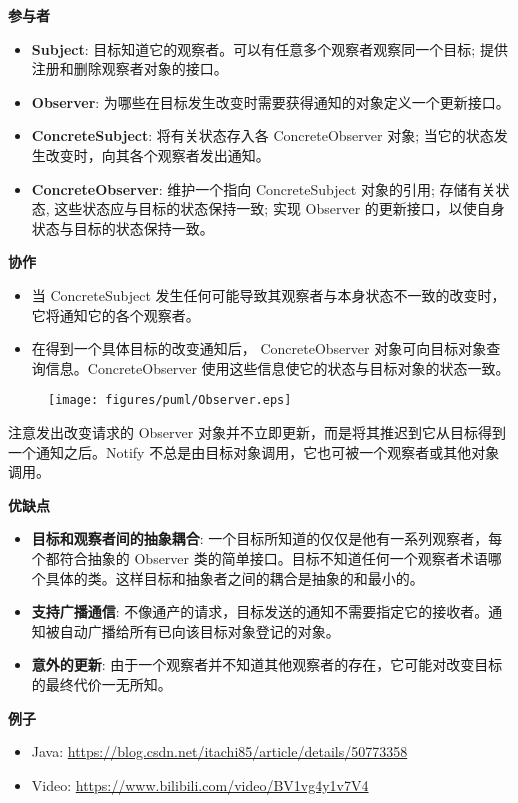 \noindent\textbf{参与者}

\begin{itemize}
    \item \textbf{Subject}: 目标知道它的观察者。可以有任意多个观察者观察同一个目标; 提供注册和删除观察者对象的接口。
    \item \textbf{Observer}: 为哪些在目标发生改变时需要获得通知的对象定义一个更新接口。
    \item \textbf{ConcreteSubject}: 将有关状态存入各 ConcreteObserver 对象; 当它的状态发生改变时，向其各个观察者发出通知。
    \item \textbf{ConcreteObserver}: 维护一个指向 ConcreteSubject 对象的引用; 存储有关状态, 这些状态应与目标的状态保持一致; 实现 Observer 的更新接口，以使自身状态与目标的状态保持一致。
\end{itemize}

\noindent\textbf{协作}

\begin{itemize}
    \item 当 ConcreteSubject 发生任何可能导致其观察者与本身状态不一致的改变时，它将通知它的各个观察者。
    \item 在得到一个具体目标的改变通知后， ConcreteObserver 对象可向目标对象查询信息。ConcreteObserver 使用这些信息使它的状态与目标对象的状态一致。
\end{itemize}

\begin{figure}[H] 
    \centering 
    \texttt{[image: figures/puml/Observer.eps]} 
\end{figure}

注意发出改变请求的 Observer 对象并不立即更新，而是将其推迟到它从目标得到一个通知之后。Notify 不总是由目标对象调用，它也可被一个观察者或其他对象调用。

\noindent\textbf{优缺点}

\begin{itemize}
    \item \textbf{目标和观察者间的抽象耦合}: 一个目标所知道的仅仅是他有一系列观察者，每个都符合抽象的 Observer 类的简单接口。目标不知道任何一个观察者术语哪个具体的类。这样目标和抽象者之间的耦合是抽象的和最小的。
    \item \textbf{支持广播通信}: 不像通产的请求，目标发送的通知不需要指定它的接收者。通知被自动广播给所有已向该目标对象登记的对象。
    \item \textbf{意外的更新}: 由于一个观察者并不知道其他观察者的存在，它可能对改变目标的最终代价一无所知。
\end{itemize}

\noindent\textbf{例子}

\begin{itemize}
    \item Java: \url{https://blog.csdn.net/itachi85/article/details/50773358}
    \item Video: \url{https://www.bilibili.com/video/BV1vg4y1v7V4}
\end{itemize}



\newpage
